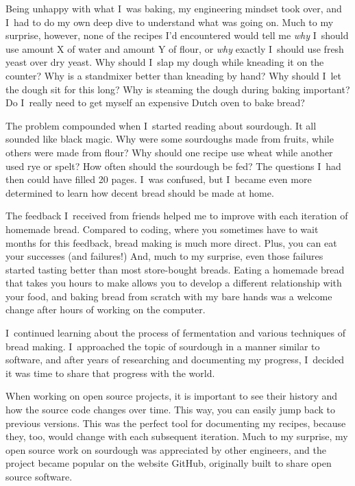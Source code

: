 Being unhappy with what I~was baking, my engineering mindset took over, and I~had
to do my own deep dive to understand what was going on. Much to my surprise, however,
none of the recipes I'd encountered would tell me \emph{why} I~should use amount X
of water and amount Y of flour, or \emph{why} exactly I~should use fresh yeast over dry yeast. Why
should I~slap my dough while kneading it on the counter? Why is a standmixer
better than kneading by hand? Why should I~let the dough sit for this long?
Why is steaming the dough during baking important? Do I~really need to
get myself an expensive Dutch oven to bake bread?

The problem compounded when I~started reading about sourdough. It all sounded like black
magic. Why were some sourdoughs made from fruits, while others were made from flour?
Why should one recipe use wheat while another used rye or spelt? How often should the
sourdough be fed? The questions I~had then could have filled 20 pages. I~was confused,
but I~became even more determined to learn how decent bread should be made at home.

The feedback I~received from friends helped me to improve with each
iteration of homemade bread. Compared to coding, where you sometimes have to wait months
for this feedback, bread making is much more direct. Plus, you can eat your successes
(and failures!) And, much to my surprise, even those failures started tasting better than
most store-bought breads. Eating a homemade bread that takes you hours to make allows you
to develop a different relationship with your food, and baking bread from scratch with my
bare hands was a welcome change after hours of working on the computer.

I~continued learning about the process of fermentation and various techniques of bread making.
I~approached the topic of sourdough in a manner similar to software, and after years of
researching and documenting my progress, I~decided it was time to share that progress with the
world.

When working on open source projects, it is important to see their history and how the source
code changes over time. This way, you can easily jump back to previous versions. This was
the perfect tool for documenting my recipes, because they, too, would change with each
subsequent iteration. Much to my surprise, my open source work on sourdough was appreciated
by other engineers, and the project became popular on the website GitHub, originally built to
share open source software.

